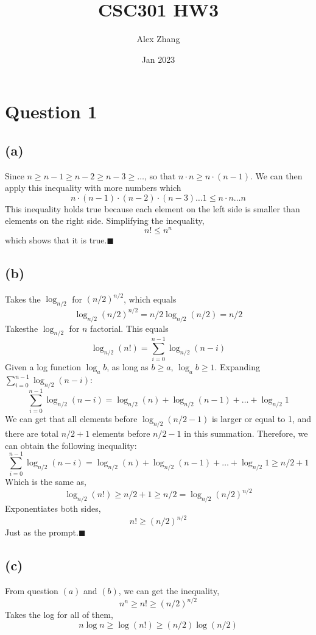 \documentclass{article}
\title{CSC301 HW3}
\author{Alex Zhang}
\date{Jan 2023}
\begin{document}
\maketitle


\section*{Question 1}

    \subsection*{(a)}
    Since $n \geq n-1 \geq n-2 \geq n-3 \geq \dots $, so that $n \cdot n \geq n \cdot  (n-1)$. We can then apply this inequality
    with more numbers which  
    $$n \cdot (n-1) \cdot (n-2) \cdot (n-3) \dots  1 \leq n\cdot n \dots n$$
    This inequality holds true because each element on the left side is smaller than elements on the right side.
    Simplifying the inequality,
    $$n! \leq n^n$$
    which shows that it is true.$\blacksquare$
    \subsection*{(b)}
    Takes the $\log_{n/2}$ for $(n/2)^{n/2}$, which equals 
    $$\log_{n/2}(n/2)^{n/2} = n/2\log_{n/2}(n/2) = n/2$$
    Takesthe $\log_{n/2}$ for $n$ factorial. This equals
    $$\log_{n/2}(n!) = \sum_{i=0}^{n-1}\log_{n/2}(n-i)$$
    Given a log function $\log_ab$, as long as $b \geq a$, $\log_ab \geq 1$. Expanding $\sum_{i=0}^{n-1}\log_{n/2}(n-i)$:
    $$\sum_{i=0}^{n-1}\log_{n/2}(n-i) = \log_{n/2}(n) + \log_{n/2}(n-1) + \dots + \log_{n/2}1$$
    We can get that all elements before $\log_{n/2}(n/2-1)$ is larger or equal to 1, and there are total $n/2 + 1$
    elements before $n/2-1$ in this summation. Therefore, we can obtain
    the following inequality:
    $$\sum_{i=0}^{n-1}\log_{n/2}(n-i) = \log_{n/2}(n) + \log_{n/2}(n-1) + \dots + \log_{n/2}1 \geq n/2 + 1$$
    Which is the same as,
    $$\log_{n/2}(n!) \geq n/2 + 1 \geq n/2 = \log_{n/2}(n/2)^{n/2} $$
    Exponentiates both sides,
    $$n! \geq (n/2)^{n/2}$$
    Just as the prompt.$\blacksquare$


    \subsection*{(c)}
    From question $(a)$ and $(b)$, we can get the inequality,
    $$n^n \geq n! \geq (n/2)^{n/2}$$
    Takes the log for all of them,
    $$n\log n \geq \log(n!) \geq (n/2)\log(n/2) $$
\end{document}
